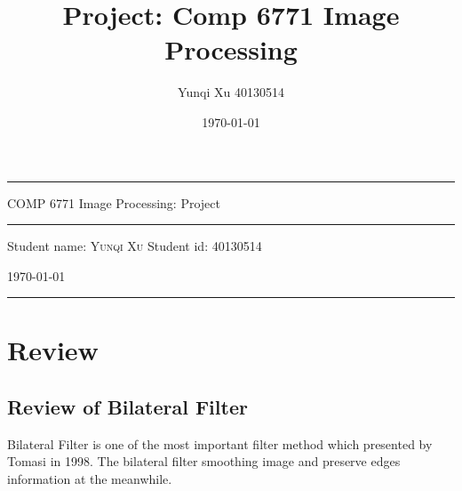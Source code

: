 \documentclass[12pt]{article}
\title{Project: Comp 6771 Image Processing}
\author{Yunqi Xu 40130514}
\date{\today}
\begin{document}
\begin{titlepage}
  \rule{\textwidth}{1pt}   %
    \vspace{0.2\textheight}  %


    {\Huge COMP 6771 Image Processing: Project}

    \vspace{0.025\textheight}   %

    \rule{0.83\textwidth}{0.4pt}  %

    \vspace{0.1\textheight}  %


    {\Large Student name: \textsc{Yunqi Xu}}
    \vfill
    {\Large Student id: 40130514}
    \vfill  %

    {\large \today}
    \vspace{0.1\textheight}  %


    \rule{\textwidth}{1pt}  %
\end{titlepage}

\section{Review}
\subsection{Review of Bilateral Filter}
Bilateral Filter is one of the most important filter method which presented by Tomasi in 1998. 
The bilateral filter smoothing image and preserve edges information at the meanwhile.
\end{document}
